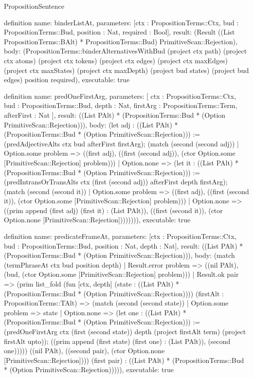\begin{lexlean}{PropositionSentence}
\begin{semanticmodule}
definition{
  name: binderListAt,
  parameters: [ctx : PropositionTerms::Ctx, bud : PropositionTerms::Bud, position : Nat, required : Bool],
  result: (Result ((List PropositionTerms::BAlt) * PropositionTerms::Bud) PrimitiveScan::Rejection),
  body: (PropositionTerms::binderAlternativesWithBud (project ctx path) (project ctx atoms) (project ctx tokens) (project ctx edges) (project ctx maxEdges) (project ctx maxStates) (project ctx maxDepth) (project bud states) (project bud edges) position required),
  executable: true
}

definition{
  name: predOneFirstArg,
  parameters: [
    ctx : PropositionTerms::Ctx,
    bud : PropositionTerms::Bud,
    depth : Nat,
    firstArg : PropositionTerms::Term,
    afterFirst : Nat
  ],
  result: ((List PAlt) * (PropositionTerms::Bud * (Option PrimitiveScan::Rejection))),
  body: (let adj : ((List PAlt) * (PropositionTerms::Bud * (Option PrimitiveScan::Rejection))) := (predAdjectiveAlts ctx bud afterFirst firstArg); (match (second (second adj))
    | Option.some problem => ((first adj), ((first (second adj)), (ctor Option.some [PrimitiveScan::Rejection] problem)))
    | Option.none => (let it : ((List PAlt) * (PropositionTerms::Bud * (Option PrimitiveScan::Rejection))) := (predIntransOrTransAlts ctx (first (second adj)) afterFirst depth firstArg); (match (second (second it))
        | Option.some problem => ((first adj), ((first (second it)), (ctor Option.some [PrimitiveScan::Rejection] problem)))
        | Option.none => ((prim append (first adj) (first it) : (List PAlt)), ((first (second it)), (ctor Option.none [PrimitiveScan::Rejection]))))))),
  executable: true
}

definition{
  name: predicateFrameAt,
  parameters: [ctx : PropositionTerms::Ctx, bud : PropositionTerms::Bud, position : Nat, depth : Nat],
  result: ((List PAlt) * (PropositionTerms::Bud * (Option PrimitiveScan::Rejection))),
  body: (match (termPhraseAt ctx bud position depth)
    | Result.error problem => ((nil PAlt), (bud, (ctor Option.some [PrimitiveScan::Rejection] problem)))
    | Result.ok pair => (prim list_fold (fun [ctx, depth] (state : ((List PAlt) * (PropositionTerms::Bud * (Option PrimitiveScan::Rejection)))) (firstAlt : PropositionTerms::TAlt) => (match (second (second state))
        | Option.some problem => state
        | Option.none => (let one : ((List PAlt) * (PropositionTerms::Bud * (Option PrimitiveScan::Rejection))) := (predOneFirstArg ctx (first (second state)) depth (project firstAlt term) (project firstAlt upto)); ((prim append (first state) (first one) : (List PAlt)), (second one))))) ((nil PAlt), ((second pair), (ctor Option.none [PrimitiveScan::Rejection]))) (first pair) : ((List PAlt) * (PropositionTerms::Bud * (Option PrimitiveScan::Rejection))))),
  executable: true
}


\end{semanticmodule}
\end{lexlean}
